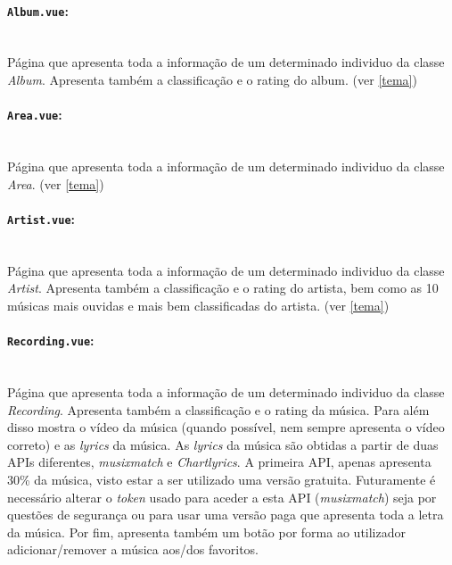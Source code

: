 \documentclass{article}
\begin{document}
\paragraph{\texttt{Album.vue}:}\mbox{}\\

Página que apresenta toda a informação de um determinado individuo da classe \textit{Album}. Apresenta também a classificação e o rating do album. (ver \ref{tema})

\paragraph{\texttt{Area.vue}:}\mbox{}\\

Página que apresenta toda a informação de um determinado individuo da classe \textit{Area}. (ver \ref{tema})

\paragraph{\texttt{Artist.vue}:}\mbox{}\\

Página que apresenta toda a informação de um determinado individuo da classe \textit{Artist}. Apresenta também a classificação e o rating do artista, bem como as 10 músicas mais ouvidas e mais bem classificadas do artista. (ver \ref{tema})

\paragraph{\texttt{Recording.vue}:}\mbox{}\\

Página que apresenta toda a informação de um determinado individuo da classe \textit{Recording}. Apresenta também a classificação e o rating da música. Para além disso mostra o vídeo da música (quando possível, nem sempre apresenta o vídeo correto) e as \textit{lyrics} da música. As \textit{lyrics} da música são obtidas a partir de duas APIs diferentes, \textit{musixmatch} e \textit{Chartlyrics}. A primeira API, apenas apresenta 30\% da música, visto estar a ser utilizado uma versão gratuita. Futuramente é necessário alterar o \textit{token} usado para aceder a esta API (\textit{musixmatch}) seja por questões de segurança ou para usar uma versão paga que apresenta toda a letra da música. Por fim, apresenta também um botão por forma ao utilizador adicionar/remover a música aos/dos favoritos.
\end{document}
